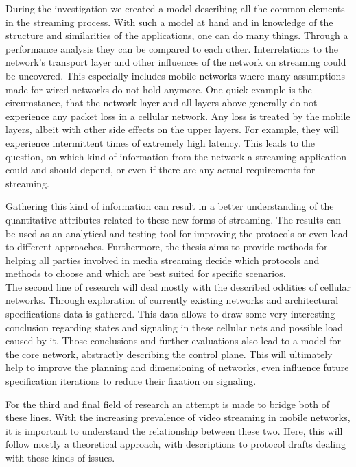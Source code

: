 During the investigation we created a model describing all the common elements in the streaming process. With such a model at hand and in knowledge of the structure and similarities of the applications, one can do many things. Through a performance analysis they can be compared to each other. Interrelations to the network's transport layer and other influences of the network on streaming could be uncovered. This especially includes mobile networks where many assumptions made for wired networks do not hold anymore. One quick example is the circumstance, that the network layer and all layers above generally do not experience any packet loss in a cellular network. Any loss is treated by the mobile layers, albeit with other side effects on the upper layers. For example, they will experience intermittent times of extremely high latency.
This leads to the question, on which kind of information from the network a streaming application could and should depend, or even if there are any actual requirements for streaming.

Gathering this kind of information can result in a better understanding of the quantitative attributes related to these new forms of streaming. The results can be used as an analytical and testing tool for improving the protocols or even lead to different approaches. Furthermore, the thesis aims to provide methods for helping all parties involved in media streaming decide which protocols and methods to choose and which are best suited for specific scenarios.
\\

The second line of research will deal mostly with the described oddities of cellular networks. Through exploration of currently existing networks and architectural specifications data is gathered. This data allows to draw some very interesting conclusion regarding states and signaling in these cellular nets and possible load caused by it. Those conclusions and further evaluations also lead to a model for the core network, abstractly describing the control plane. This will ultimately help to improve the planning and dimensioning of networks, even influence future specification iterations to reduce their fixation on signaling.


For the third and final field of research an attempt is made to bridge both of these lines. With the increasing prevalence of video streaming in mobile networks, it is important to understand the relationship between these two. Here, this will follow mostly a theoretical approach, with descriptions to protocol drafts dealing with these kinds of issues. 

